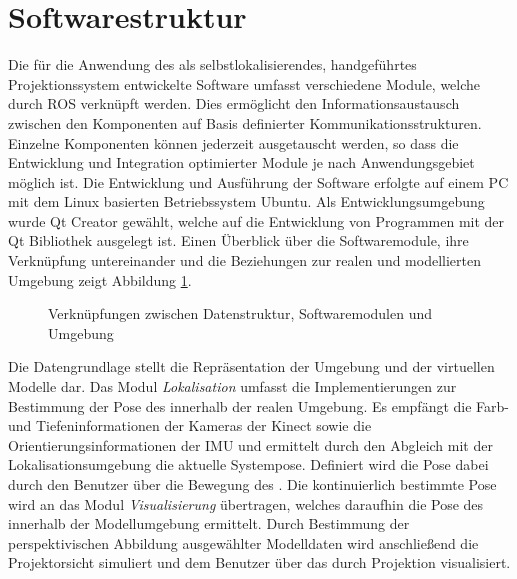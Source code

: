 
\prever{
}

\prever{
}
\section{Softwarestruktur}
\label{chap.softwarestruct}
Die für die Anwendung des  als selbstlokalisierendes, handgeführtes Projektionssystem entwickelte Software umfasst verschiedene Module, welche durch ROS verknüpft werden. Dies ermöglicht den Informationsaustausch zwischen den Komponenten auf Basis definierter Kommunikationsstrukturen. Einzelne Komponenten können jederzeit ausgetauscht werden, so dass die Entwicklung und Integration optimierter Module je nach Anwendungsgebiet möglich ist. Die Entwicklung und Ausführung der Software erfolgte auf einem PC mit dem Linux basierten Betriebssystem Ubuntu. Als Entwicklungsumgebung wurde Qt Creator gewählt, welche auf die Entwicklung von Programmen mit der Qt Bibliothek ausgelegt ist. Einen Überblick über die Softwaremodule, ihre Verknüpfung untereinander und die Beziehungen zur realen und modellierten Umgebung zeigt Abbildung \ref{fig.modules}.

\begin{figure}[!ht]
	\begin{center}%
		\caption{Verknüpfungen zwischen Datenstruktur, Softwaremodulen und Umgebung}
		\label{fig.modules}
	\end{center}
	\vspace*{-12mm}
\end{figure}

\prever{
}

Die Datengrundlage stellt die Repräsentation der Umgebung und der virtuellen Modelle dar. Das Modul \textit{Lokalisation} umfasst die Implementierungen zur Bestimmung der Pose des  innerhalb der realen Umgebung. Es empfängt die Farb- und Tiefeninformationen der Kameras der Kinect sowie die Orientierungsinformationen der IMU und ermittelt durch den Abgleich mit der Lokalisationsumgebung die aktuelle Systempose. Definiert wird die Pose dabei durch den Benutzer über die Bewegung des . Die kontinuierlich bestimmte Pose wird an das Modul \textit{Visualisierung} übertragen, welches daraufhin die Pose des  innerhalb der Modellumgebung ermittelt. Durch Bestimmung der perspektivischen Abbildung ausgewählter Modelldaten wird anschließend die Projektorsicht simuliert und dem Benutzer über das \kps{} durch Projektion visualisiert.\\ 

